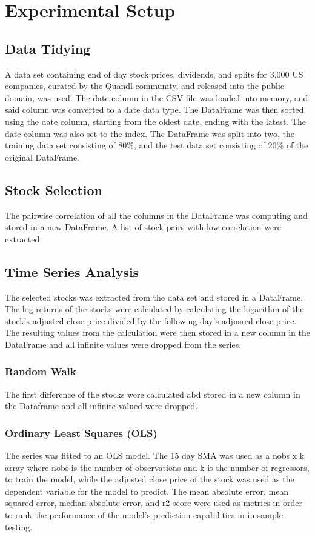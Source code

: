 \chapter{Experimental Setup}

\section{Data Tidying}
A data set containing end of day stock prices, dividends, and splits for 3,000 US companies, curated by the Quandl community, and released into the public domain, was used. The date column in the CSV file was loaded into memory, and said column was converted to a date data type. The DataFrame was then sorted using the date column, starting from the oldest date, ending with the latest. The date column was also set to the index. The DataFrame was split into two, the training data set consisting of 80\%, and the test data set consisting of 20\% of the original DataFrame.

\section{Stock Selection}
The pairwise correlation of all the columns in the DataFrame was computing and stored in a new DataFrame. A list of stock pairs with low correlation were extracted.

\section{Time Series Analysis}
The selected stocks was extracted from the data set and stored in a DataFrame. The log returns of the stocks were calculated by calculating the logarithm of the stock's adjusted close price divided by the following day's adjusred close price. The resulting values from the calculation were then stored in a new column in the DataFrame and all infinite values were dropped from the series.

\subsection{Random Walk}
The first difference of the stocks were calculated abd stored in a new column in the Dataframe and all infinite valued were dropped.

\subsection{Ordinary Least Squares (OLS)}
The series was fitted to an OLS model. The 15 day SMA was used as a nobs x k array where nobs is the number of observations and k is the number of regressors, to train the model, while the adjusted close price of the stock was used as the dependent variable for the model to predict. The mean absolute error, mean squared error, median absolute error, and r2 score were used as metrics in order to rank the performance of the model's prediction capabilities in in-sample testing.

